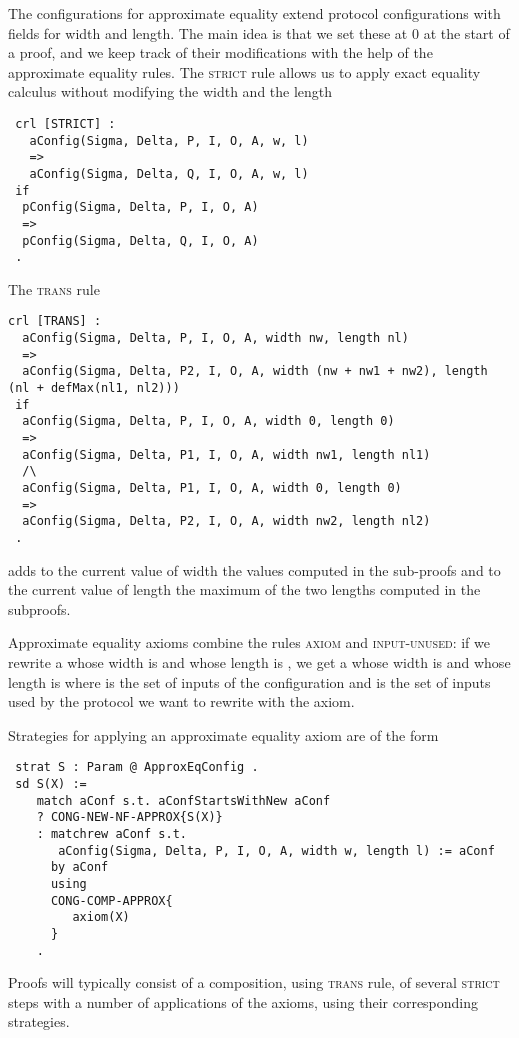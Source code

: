 The configurations 
for approximate equality
extend protocol configurations with fields for width and length.
The main idea is that we set these at 0 at the start of a proof,
and we keep track of their modifications with the help of the 
approximate equality rules.
The \textsc{strict} rule allows us to apply exact equality calculus
without modifying the width and the length
\begin{lstlisting}
 crl [STRICT] :
   aConfig(Sigma, Delta, P, I, O, A, w, l) 
   =>
   aConfig(Sigma, Delta, Q, I, O, A, w, l)
 if
  pConfig(Sigma, Delta, P, I, O, A)
  => 
  pConfig(Sigma, Delta, Q, I, O, A)
 . 
\end{lstlisting}
The \textsc{trans} rule
\begin{lstlisting}
crl [TRANS] :
  aConfig(Sigma, Delta, P, I, O, A, width nw, length nl)
  => 
  aConfig(Sigma, Delta, P2, I, O, A, width (nw + nw1 + nw2), length (nl + defMax(nl1, nl2)))
 if
  aConfig(Sigma, Delta, P, I, O, A, width 0, length 0)
  => 
  aConfig(Sigma, Delta, P1, I, O, A, width nw1, length nl1)
  /\ 
  aConfig(Sigma, Delta, P1, I, O, A, width 0, length 0)
  => 
  aConfig(Sigma, Delta, P2, I, O, A, width nw2, length nl2)
 . 
\end{lstlisting}
\noindent adds to the current value of width the values
computed in the sub-proofs and to the current value of length
the maximum of the two lengths computed in the subproofs.

Approximate equality axioms combine the rules \textsc{axiom} and
\textsc{input-unused}: if we rewrite a \code{aConfig} whose width is 
\code{w} and whose length is \code{l},
we get a  whose width is  and
whose length is  where  is the set of 
inputs of the configuration and \code{I'} is the set of inputs used 
by the protocol we want to rewrite with the axiom.
 
Strategies for applying an approximate equality axiom are of the form
\begin{lstlisting}
 strat S : Param @ ApproxEqConfig .  
 sd S(X) := 
    match aConf s.t. aConfStartsWithNew aConf
    ? CONG-NEW-NF-APPROX{S(X)} 
    : matchrew aConf s.t. 
       aConfig(Sigma, Delta, P, I, O, A, width w, length l) := aConf 
      by aConf 
      using
      CONG-COMP-APPROX{
         axiom(X)
      } 
    .
\end{lstlisting}

Proofs will typically consist of a composition, using \textsc{trans} rule,
of several \textsc{strict} steps with a number of applications of the axioms, using their corresponding strategies.

